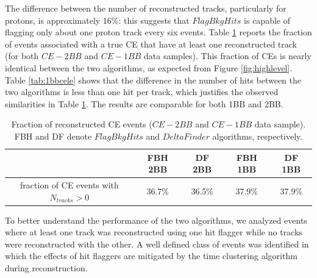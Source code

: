The difference between the number of 
reconstructed tracks, particularly 
for protons, is approximately 16\%:  
this suggests that $FlagBkgHits$ is 
capable of flagging only about one 
proton track every six events. 
Table \ref{tab:recoeffcele} reports 
the fraction of events associated 
with a true CE that have at least one 
reconstructed track (for both 
$CE-2BB$ and $CE-1BB$ data samples). 
This fraction of CEs is nearly identical 
between the two algorithms, 
as expected from Figure \ref{fig:highlevel}. 
Table \ref{tab:1bbcele} shows 
that the difference in the number of 
hits between the two algorithms 
is less than one hit per track, which 
justifies the observed similarities in 
Table \ref{tab:recoeffcele}. The 
results are comparable for both 1BB and 2BB.



\begin{center}
    \begin{table}[h!]
    \centering
    \renewcommand{\arraystretch}{1.}
    \begin{tabular}{| c | c | c | c | c |} 
    \hline
    & FBH 2BB & DF 2BB & FBH 1BB & DF 1BB  \\
    \hline
    fraction of CE events with $N_{tracks}>0$ & 36.7\% & 36.5\% & 37.9\% & 37.9\%\\
    \hline
    \end{tabular}
    \caption{Fraction of reconstructed CE events ($CE-2BB$ and $CE-1BB$ data sample). FBH and DF denote  
    $FlagBkgHits$ and $DeltaFinder$ algorithms, respectively.}
    \label{tab:recoeffcele}
\end{table}
\end{center}

To better understand the performance of the two algorithms, 
we analyzed events where at least one track was reconstructed 
using one hit flagger while no tracks were reconstructed 
with the other. A well defined class of events was identified in 
which the effects of hit flaggers are mitigated by the time 
clustering algorithm during reconstruction.

